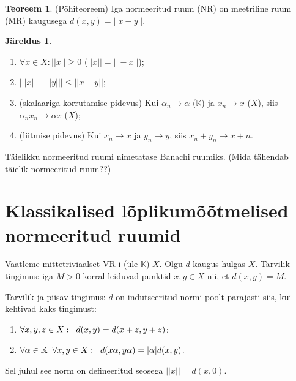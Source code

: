 \documentclass{article}[12pt]
\newcommand{\h}{\hspace{0.2cm}}
\newcommand{\K}{\mathbb{K}}
\newcommand{\norm}[1]{||#1||}
\theoremstyle{definition}
\theoremstyle{definition}
\newtheorem{theorem}{Teoreem}[section]
\theoremstyle{definition}
\newtheorem{jareldus}{Järeldus}[section]
\theoremstyle{break}
\begin{document}
\begin{theorem}
	(Põhiteoreem) Iga normeeritud ruum (NR) on meetriline ruum (MR) kaugusega $d(x,y) = ||x-y||$.
\end{theorem}

\begin{jareldus}
	\begin{enumerate}
		\item $\forall x\in X: \norm{x} \geq 0$ ($\norm{x} = \norm{-x}$);
		\item $\bigg\lvert \norm{x} - \norm{y} \bigg\rvert \leq \norm{x+y}$;
		\item (skalaariga korrutamise pidevus) Kui $\alpha_n\rightarrow \alpha$ ($\K$) ja $x_n\rightarrow x$ ($X$), siis $\alpha_n x_n\rightarrow \alpha x$ ($X$);
		\item (liitmise pidevus) Kui $x_n\rightarrow x$ ja $y_n\rightarrow y$, siis $x_n+y_n \rightarrow x+n$.
	\end{enumerate}
\end{jareldus}

Täielikku normeeritud ruumi nimetatase Banachi ruumiks. (Mida tähendab täielik normeeritud ruum??)

\section{Klassikalised lõplikumõõtmelised normeeritud ruumid}

Vaatleme mittetriviaalset VR-i (üle $\K$) $X$. Olgu $d$ kaugus hulgas $X$.
Tarvilik tingimus: iga $M>0$ korral leiduvad punktid $x,y\in X$ nii, et $d(x,y) = M$.

Tarvilik ja piisav tingimus: $d$ on indutseeritud normi poolt parajasti siis, kui kehtivad kaks tingimust:
\begin{enumerate}
	\item $\forall x,y,z\in X :\h d(x,y) = d(x+z,y+z)$;
	\item $\forall \alpha\in \K \h\forall x,y\in X: \h d(x\alpha,y\alpha) = |\alpha|d(x,y)$.
\end{enumerate}
Sel juhul see norm on defineeritud seosega $\norm{x} = d(x,0)$.
\end{document}
